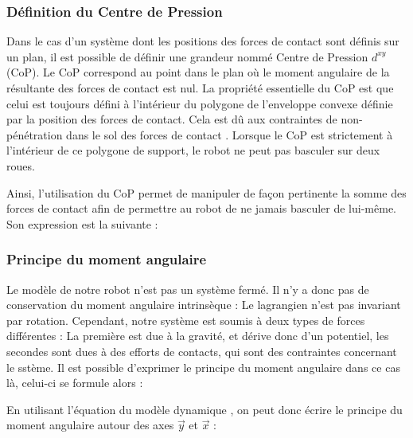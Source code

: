 			\subsubsection{Définition du Centre de Pression}
			
				Dans le cas d'un système dont les positions des forces de contact sont définis sur un plan, il est possible de définir une grandeur nommé Centre de Pression $d^{xy}$ (CoP).
				Le CoP correspond au point dans le plan où le moment angulaire de la résultante des forces de contact est nul.
				La propriété essentielle du CoP est que celui est toujours défini à l'intérieur du polygone de l'enveloppe convexe définie par la position des forces de contact.
				Cela est dû aux contraintes de non-pénétration dans le sol des forces de contact .
				Lorsque le CoP est strictement à l'intérieur de ce polygone de support, le robot ne peut pas basculer sur deux roues.
				
				Ainsi, l'utilisation du CoP permet de manipuler de façon pertinente la somme des forces de contact afin de permettre au robot de ne jamais basculer de lui-même.
				Son expression est la suivante :
				
			
			\subsubsection{Principe du moment angulaire}
			
				Le modèle de notre robot n'est pas un système fermé. Il n'y a donc pas de conservation du moment angulaire intrinsèque : Le lagrangien n'est pas invariant par rotation.
				Cependant, notre système est soumis à deux types de forces différentes : La première est due à la gravité, et dérive donc d'un potentiel, les secondes sont dues à des efforts de contacts, qui sont des contraintes concernant le sstème.
				Il est possible d'exprimer le principe du moment angulaire dans ce cas là, celui-ci se formule alors :
				
				
				En utilisant l'équation du modèle dynamique , on peut donc écrire le principe du moment angulaire autour des axes $\vec{y}$ et $\vec{x}$ :
				
